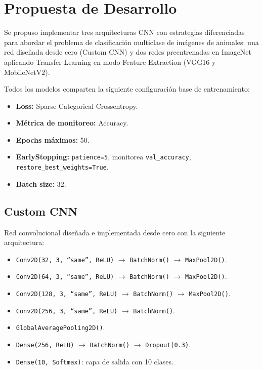 \documentclass[1p,12pt]{elsarticle}
\begin{document}
\section{Propuesta de Desarrollo}
\label{sec:propuesta}

Se propuso implementar tres arquitecturas CNN con estrategias diferenciadas para
abordar el problema de clasificación multiclase de imágenes de animales: una red
diseñada desde cero (Custom CNN) y dos redes preentrenadas en ImageNet
aplicando Transfer Learning en modo Feature Extraction (VGG16 y MobileNetV2).

Todos los modelos comparten la siguiente configuración base de entrenamiento:

\begin{itemize}
    \item \textbf{Loss:} Sparse Categorical Crossentropy.
    \item \textbf{Métrica de monitoreo:} Accuracy.
    \item \textbf{Epochs máximos:} 50.
    \item \textbf{EarlyStopping:} \texttt{patience=5}, monitorea
          \texttt{val\_accuracy},\\ \texttt{restore\_best\_weights=True}.
    \item \textbf{Batch size:} 32.
\end{itemize}

\subsection{Custom CNN}
\label{sub:custom_cnn}

Red convolucional diseñada e implementada desde cero con la siguiente
arquitectura:

\begin{itemize}
    \item \texttt{Conv2D(32,\,3,\,``same'',\,ReLU)} $\rightarrow$
          \texttt{BatchNorm()} $\rightarrow$ \texttt{MaxPool2D()}.
    \item \texttt{Conv2D(64,\,3,\,``same'',\,ReLU)} $\rightarrow$
          \texttt{BatchNorm()} $\rightarrow$ \texttt{MaxPool2D()}.
    \item \texttt{Conv2D(128,\,3,\,``same'',\,ReLU)} $\rightarrow$
          \texttt{BatchNorm()} $\rightarrow$ \texttt{MaxPool2D()}.
    \item \texttt{Conv2D(256,\,3,\,``same'',\,ReLU)} $\rightarrow$
          \texttt{BatchNorm()}.
    \item \texttt{GlobalAveragePooling2D()}.
    \item \texttt{Dense(256,\,ReLU)} $\rightarrow$ \texttt{BatchNorm()}
          $\rightarrow$ \texttt{Dropout(0.3)}.
    \item \texttt{Dense(10,\,Softmax)}: capa de salida con 10 clases.
\end{itemize}
\end{document}
